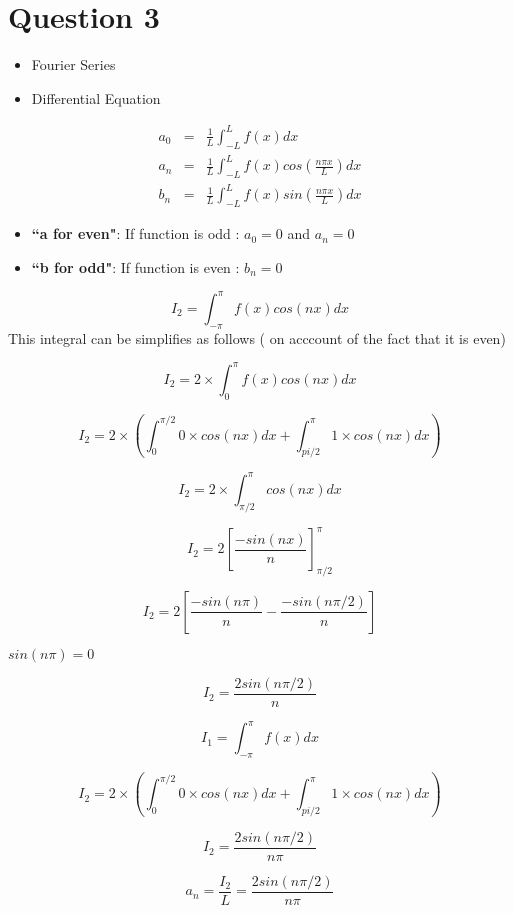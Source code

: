 \documentclass[11pt,a4paper,titlepage,oneside,openany]{article}
\numberwithin{equation}{section}
\numberwithin{algorithm}{section}
\numberwithin{figure}{section}
\numberwithin{table}{section}
\begin{document}
\section*{Question 3}
{\Large
\begin{itemize}
\item Fourier Series
\item Differential Equation
\end{itemize}
\begin{eqnarray}
a_0 &=& \frac{1}{L}\int^{L }_{-L} f(x) dx \\
a_n &=& \frac{1}{L}\int^{L }_{-L} f(x) cos(\frac{n\pi x}{L}) dx \\
b_n &=& \frac{1}{L}\int^{L }_{-L} f(x) sin(\frac{n\pi x}{L}) dx
\end{eqnarray}

\begin{itemize}
\item \textbf{ ``a for even"}: If function is odd : $a_0 = 0$ and $a_n=0$
\item \textbf{ ``b for odd"}: If function is even : $b_n=0$
\end{itemize}
}
\newpage
{\Large
\[ I_2 =  \int^{\pi}_{-\pi} f(x)cos(nx) dx \]
This integral can be simplifies as follows ( on acccount of the fact that it is even)

\[ I_2 =  2 \times \int^{\pi}_{0} f(x)cos(nx) dx \]

\[ I_2 =  2 \times \left( \int^{\pi/2}_{0} 0 \times cos(nx) dx + \int^{\pi}_{pi/2} 1 \times cos(nx) dx \right) \]

\[ I_2 =  2 \times  \int^{\pi}_{\pi/2}  cos(nx) dx  \]

\[ I_2 =  2 \left[  \frac{-sin(nx)}{n} \right]^{\pi}_{\pi/2}   \]

\[ I_2 =  2 \left[  \frac{-sin(n\pi)}{n} - \frac{-sin(n\pi/2)}{n} \right]   \]

$sin(n\pi) = 0$


\[ I_2 =  \frac{2sin(n\pi/2)}{n}   \]

\[ I_1 =  \int^{\pi}_{-\pi} f(x) dx \]

\[ I_2 =  2 \times \left( \int^{\pi/2}_{0} 0 \times cos(nx) dx + \int^{\pi}_{pi/2} 1 \times cos(nx) dx \right) \]

\[I_2 =\frac{2sin(n\pi /2)}{n \pi}   \]

\[a_n = \frac{I_2}{L} =\frac{2sin(n\pi /2)}{n \pi}   \]
}
\newpage
\end{document}
